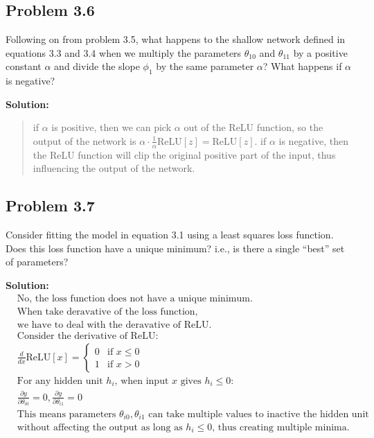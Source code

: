 \documentclass{article}
\begin{document}
    \subsection*{Problem 3.6}
    Following on from problem 3.5, what happens to the shallow network defined in equations 3.3 and 3.4 when we multiply the parameters $\theta_{10}$ and $\theta_{11}$ by a positive constant $\alpha$ and divide the slope $\phi_1$ by the same parameter $\alpha$? What happens if $\alpha$ is negative?

        \vspace{1cm}
        \textbf{Solution:}
        \begin{quote}
            if $\alpha$ is positive, then we can pick $\alpha$ out of the ReLU function, so the output of the network is $\alpha \cdot \frac{1}{\alpha} \text{ReLU}[z] = \text{ReLU}[z]$.
            if $\alpha$ is negative, then the ReLU function will clip the original positive part of the input, thus influencing the output of the network.
        \end{quote}

    \subsection*{Problem 3.7}
    Consider fitting the model in equation 3.1 using a least squares loss function. Does this loss function have a unique minimum? i.e., is there a single ``best'' set of parameters?

        \vspace{1cm}
        \textbf{Solution:}
        \begin{align*}
            &\text{No, the loss function does not have a unique minimum.} \\
            &\text{When take deravative of the loss function,  } \\
            &\text{we have to deal with the deravative of ReLU.} \\
            &\text{Consider the derivative of ReLU:} \\
            &\frac{d}{dx}\text{ReLU}[x] = \begin{cases}
                0 & \text{if } x \leq 0 \\
                1 & \text{if } x > 0
            \end{cases} \\
            &\text{For any hidden unit } h_i \text{, when input } x \text{ gives } h_i \leq 0\text{:} \\
            &\frac{\partial y}{\partial \theta_{i0}} = 0 , \frac{\partial y}{\partial \theta_{i1}} = 0 \\
            &\text{This means parameters } \theta_{i0}, \theta_{i1} \text{ can take multiple values to inactive the hidden unit} \\
            &\text{without affecting the output as long as } h_i \leq 0\text{, thus creating multiple minima.}
        \end{align*}
\end{document}
